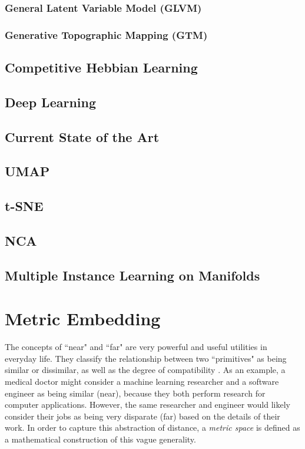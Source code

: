 \subsubsection{General Latent Variable Model (GLVM)}

\subsubsection{Generative Topographic Mapping (GTM)}

\subsection{Competitive Hebbian Learning}

\subsection{Deep Learning}

\subsection{Current State of the Art}
\subsection{UMAP}

\subsection{t-SNE}

\subsection{NCA}

\subsection{Multiple Instance Learning on Manifolds}

\section{Metric Embedding}

The concepts of ``near" and ``far" are very powerful and useful utilities in everyday life.  They classify the relationship between two ``primitives" as being similar or dissimilar, as well as the degree of compatibility \citep{Thorstensen2009ManifoldThesis}. As an example, a medical doctor might consider a machine learning researcher and a software engineer as being similar (near), because they both perform research for computer applications.  However, the same researcher and engineer would likely consider their jobs as being very disparate (far) based on the details of their work.  In order to capture this abstraction of distance, a \textit{metric space} is defined as a mathematical construction  of this vague generality.

